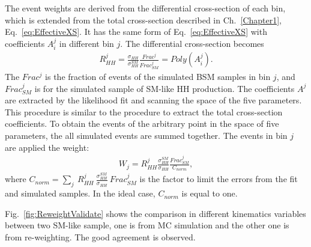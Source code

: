 The event weights are derived from the differential cross-section of each bin, which is extended from the total cross-section described in Ch.~\ref{Chapter1}, Eq.~\ref{eq:EffectiveXS}.
It has the same form of Eq.~\ref{eq:EffectiveXS} with coefficients ${A}_{i}^{j}$ in different bin $j$.
The differential cross-section becomes
\begin{equation} \label{eq:DiffXS}
  \begin{aligned}
	R_{HH}^{j}=\frac{\sigma_{HH}}{\sigma^{SM}_{HH}} \frac{Frac^{j}}{Frac^{j}_{SM}}=Poly({A}_{i}^{j}).
  \end{aligned}
\end{equation}
The $Frac^{j}$ is the fraction of events of the simulated BSM samples in bin $j$, and $Frac^{j}_{SM}$ is for the simulated sample of SM-like HH production.
The coefficients ${A}^{j}$ are extracted by the likelihood fit and scanning the space of the five parameters.
This procedure is similar to the procedure to extract the total cross-section coefficients.
To obtain the events of the arbitrary point in the space of five parameters, the all simulated events are summed together.
The events in bin $j$ are applied the weight:
\begin{equation} \label{eq:ReWeight}
  \begin{aligned}
	W_{j}=R_{HH}^{j} \frac{\sigma^{SM}_{HH}}{\sigma_{HH}} \frac{Frac^{j}_{SM}}{C_{norm}} ,  %
  \end{aligned}
\end{equation}
where $C_{norm} = \sum\limits_{j}~R_{HH}^{j}~\frac{\sigma^{SM}_{HH}}{\sigma_{HH}}~{Frac}^{j}_{SM}$ is the factor to limit the errors from the fit and simulated samples. In the ideal case, $C_{norm}$ is equal to one.

Fig.~\ref{fig:ReweightValidate} shows the comparison in different kinematics variables between two SM-like sample, one is from MC simulation and the other one is from re-weighting.
The good agreement is observed.

